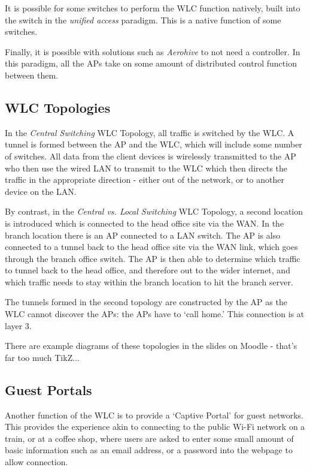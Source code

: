 It is possible for some switches to perform the WLC function natively, built into the switch in the \textit{unified access} paradigm. This is a native function of some switches.

Finally, it is possible with solutions such as \textit{Aerohive} to not need a controller. In this paradigm, all the APs take on some amount of distributed control function between them. 

\subsection{WLC Topologies}
In the \textit{Central Switching} WLC Topology, all traffic is switched by the WLC. A tunnel is formed between the AP and the WLC, which will include some number of switches. All data from the client devices is wirelessly transmitted to the AP who then use the wired LAN to transmit to the WLC which then directs the traffic in the appropriate direction - either out of the network, or to another device on the LAN.

By contrast, in the \textit{Central vs. Local Switching} WLC Topology, a second location is introduced which is connected to the head office site via the WAN. In the branch location there is an AP connected to a LAN switch. The AP is also connected to a tunnel back to the head office site via the WAN link, which goes through the branch office switch. The AP is then able to determine which traffic to tunnel back to the head office, and therefore out to the wider internet, and which traffic needs to stay within the branch location to hit the branch server.

The tunnels formed in the second topology are constructed by the AP as the WLC cannot discover the APs: the APs have to `call home.' This connection is at layer 3. 

\begin{extlink}
There are example diagrams of these topologies in the slides on Moodle - that's far too much TikZ...
\end{extlink}

\subsection{Guest Portals}
Another function of the WLC is to provide a `Captive Portal' for guest networks. This provides the experience akin to connecting to the public Wi-Fi network on a train, or at a coffee shop, where users are asked to enter some small amount of basic information such as an email address, or a password into the webpage to allow connection.

